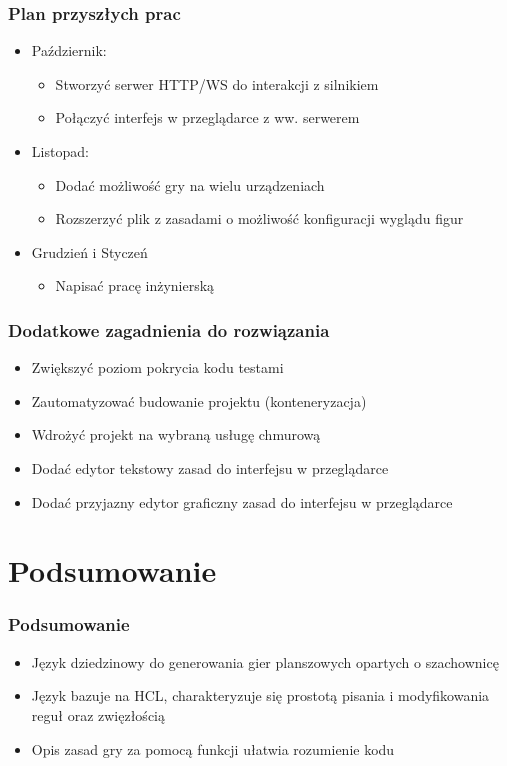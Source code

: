 \documentclass{beamer}
\begin{document}
\begin{frame}
	\frametitle{Plan przyszłych prac}
	\begin{itemize}
		\item Październik:
		      \begin{itemize}
			      \item Stworzyć serwer HTTP/WS do interakcji z silnikiem
			      \item Połączyć interfejs w przeglądarce z ww. serwerem
		      \end{itemize}
		\item Listopad:
		      \begin{itemize}
			      \item Dodać możliwość gry na wielu urządzeniach
			      \item Rozszerzyć plik z zasadami o możliwość konfiguracji wyglądu figur
		      \end{itemize}
		\item Grudzień i Styczeń
		      \begin{itemize}
			      \item Napisać pracę inżynierską
		      \end{itemize}
	\end{itemize}
\end{frame}

\begin{frame}
	\frametitle{Dodatkowe zagadnienia do rozwiązania}
	\begin{itemize}
		\item Zwiększyć poziom pokrycia kodu testami
		\item Zautomatyzować budowanie projektu (konteneryzacja)
		\item Wdrożyć projekt na wybraną usługę chmurową
		\item Dodać edytor tekstowy zasad do interfejsu w przeglądarce
		\item Dodać przyjazny edytor graficzny zasad do interfejsu w przeglądarce
	\end{itemize}
\end{frame}

\section{Podsumowanie}

\begin{frame}
	\frametitle{Podsumowanie}

	\begin{itemize}
		\item Język dziedzinowy do generowania gier planszowych opartych o szachownicę
		\item Język bazuje na HCL, charakteryzuje się prostotą pisania i modyfikowania reguł oraz zwięzłością
		\item Opis zasad gry za pomocą funkcji ułatwia rozumienie kodu
	\end{itemize}
\end{frame}
\end{document}
